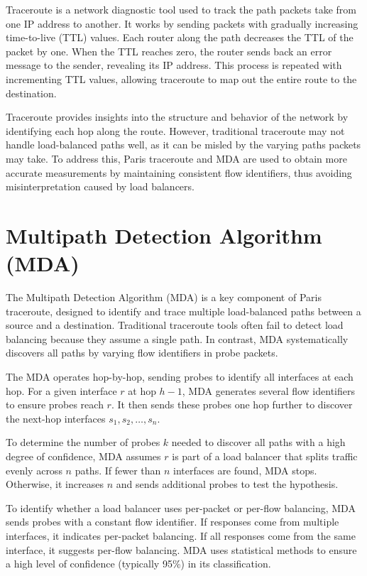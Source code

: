 \documentclass[12pt]{cwru_thesis}
\begin{document}
Traceroute is a network diagnostic tool used to track the path packets take from one IP address to another. It works by sending packets with gradually increasing time-to-live (TTL) values. Each router along the path decreases the TTL of the packet by one. When the TTL reaches zero, the router sends back an error message to the sender, revealing its IP address. This process is repeated with incrementing TTL values, allowing traceroute to map out the entire route to the destination.

Traceroute provides insights into the structure and behavior of the network by identifying each hop along the route. However, traditional traceroute may not handle load-balanced paths well, as it can be misled by the varying paths packets may take. To address this, Paris traceroute and MDA are used to obtain more accurate measurements by maintaining consistent flow identifiers, thus avoiding misinterpretation caused by load balancers.

\section{Multipath Detection Algorithm (MDA)}

The Multipath Detection Algorithm (MDA) is a key component of Paris traceroute, designed to identify and trace multiple load-balanced paths between a source and a destination. Traditional traceroute tools often fail to detect load balancing because they assume a single path. In contrast, MDA systematically discovers all paths by varying flow identifiers in probe packets.

The MDA operates hop-by-hop, sending probes to identify all interfaces at each hop. For a given interface \(r\) at hop \(h-1\), MDA generates several flow identifiers to ensure probes reach \(r\). It then sends these probes one hop further to discover the next-hop interfaces \(s_1, s_2, \ldots, s_n\).

To determine the number of probes \(k\) needed to discover all paths with a high degree of confidence, MDA assumes \(r\) is part of a load balancer that splits traffic evenly across \(n\) paths. If fewer than \(n\) interfaces are found, MDA stops. Otherwise, it increases \(n\) and sends additional probes to test the hypothesis.

To identify whether a load balancer uses per-packet or per-flow balancing, MDA sends probes with a constant flow identifier. If responses come from multiple interfaces, it indicates per-packet balancing. If all responses come from the same interface, it suggests per-flow balancing. MDA uses statistical methods to ensure a high level of confidence (typically 95\%) in its classification.
\end{document}
